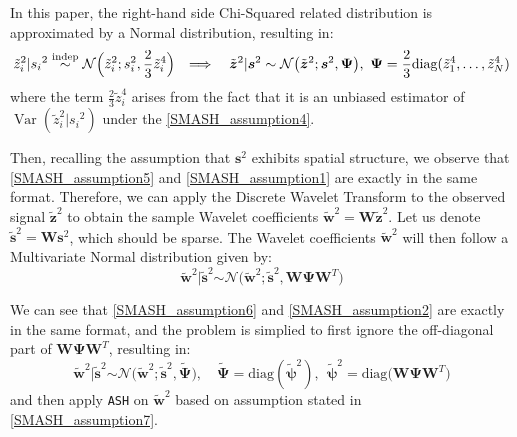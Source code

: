 \documentclass[11pt]{article}
\begin{document}
In this paper, the right-hand side Chi-Squared related distribution is approximated by a Normal distribution, resulting in:
\begin{equation}
\tilde{z}_i^2 \vert {s_i}^2 \stackrel{\text{indep}}{\sim} \mathcal{N} \Bigl (\tilde{z}_i^2; s_i^2, \frac{2}{3} \tilde{z}_i^4 \Bigl) \quad \Longrightarrow \quad \tilde{\boldsymbol{z}}^2 \vert \boldsymbol{s}^2 \stackrel{\text{}}{\sim} \mathcal{N} \bigl(\tilde{\boldsymbol{z}}^2; \boldsymbol{s}^2, \boldsymbol{\Psi} \bigl), \ \boldsymbol{\Psi} = \frac{2}{3}\text{diag}(\tilde{z}_1^4, \ldots, \tilde{z}_N^4) 
\label{SMASH_assumption5}
\end{equation}
where the term $\frac{2}{3} \tilde{z}_i^4$ arises from the fact that it is an unbiased estimator of $\operatorname{Var}(\tilde{z}_i^2 \vert {s_i}^2)$ under the \eqref{SMASH_assumption4}.

Then, recalling the assumption that $\boldsymbol{s}^2$ exhibits spatial structure, we observe that \eqref{SMASH_assumption5} and \eqref{SMASH_assumption1} are exactly in the same format. Therefore, we can apply the Discrete Wavelet Transform to the observed signal $\tilde{\boldsymbol{z}}^2$ to obtain the sample Wavelet coefficients $\tilde{\boldsymbol{w}}^2 = \mathbf{W} \tilde{\boldsymbol{z}}^2$. Let us denote $\tilde{\boldsymbol{s}}^2 = \mathbf{W} \boldsymbol{s}^2$, which should be sparse. The Wavelet coefficients $\tilde{\boldsymbol{w}}^2$ will then follow a Multivariate Normal distribution given by:
\begin{equation}
\tilde{\boldsymbol{w}}^2 \vert \tilde{\boldsymbol{s}}^2 \stackrel{\text{}}{\sim} \mathcal{N} \bigl(\tilde{\boldsymbol{w}}^2; \tilde{\boldsymbol{s}}^2, \mathbf{W}\mathbf{\Psi}\mathbf{W}^T \bigl) 
\label{SMASH_assumption6}
\end{equation}

We can see that \eqref{SMASH_assumption6} and \eqref{SMASH_assumption2} are exactly in the same format, and the problem is simplied to first ignore the off-diagonal part of $\mathbf{W}\mathbf{\Psi}\mathbf{W}^T$, resulting in:
\begin{equation}
\tilde{\boldsymbol{w}}^2 \vert \tilde{\boldsymbol{s}}^2 \stackrel{\text{}}{\sim} \mathcal{N} \bigl(\tilde{\boldsymbol{w}}^2; \tilde{\boldsymbol{s}}^2, \tilde{\boldsymbol{\Psi}}  \bigl), \quad \tilde{\boldsymbol{\Psi}} = \text{diag} ( \tilde{\boldsymbol{\psi}}^2 ), \ \ \tilde{\boldsymbol{\psi}}^2 = \text{diag} \bigl(\mathbf{W}\mathbf{\Psi}\mathbf{W}^T \bigl)  
\label{SMASH_assumption7}
\end{equation}
and then apply \verb|ASH| on $\tilde{\boldsymbol{w}}^2$ based on assumption stated in \eqref{SMASH_assumption7}.
\end{document}
